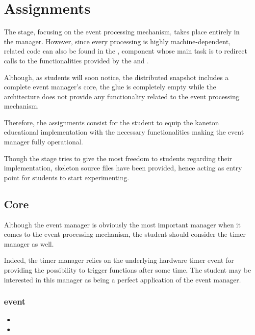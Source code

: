 %
%

\section{Assignments}

The  stage, focusing on the event processing mechanism, takes place
entirely in the  manager. However, since every processing is
highly machine-dependent, related code can also be found in the ,
component whose main task is to redirect calls to the functionalities provided
by the  and .

Although, as students will soon notice, the distributed snapshot includes a
complete event manager's core, the glue is completely empty while the
architecture does not provide any functionality related to the event
processing mechanism.

Therefore, the  assignments consist for the student to equip the
kaneton educational implementation with the necessary functionalities making
the event manager fully operational.

Though the stage tries to give the most freedom to students regarding their
implementation, skeleton source files have been provided, hence acting
as entry point for students to start experimenting.

\subsection{Core}

Although the event manager is obviously the most important manager when
it comes to the event processing mechanism, the student should consider
the timer manager as well.

Indeed, the timer manager relies on the underlying hardware timer event
for providing the possibility to trigger functions after some time. The
student may be interested in this manager as being a perfect application
of the event manager.

\subsubsection*{event}

\begin{itemize}
  \item
  \item
\end{itemize}

